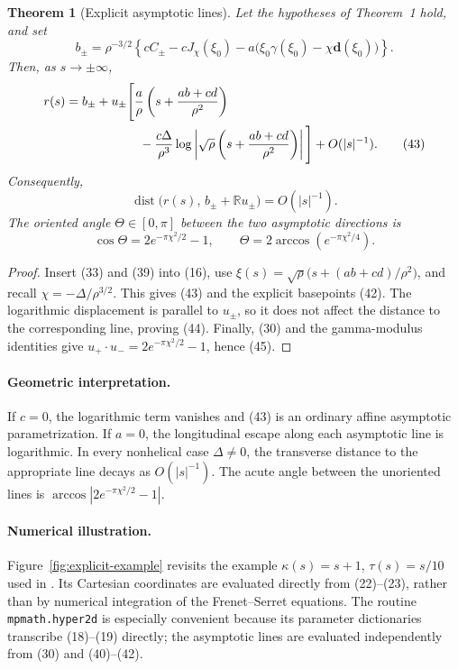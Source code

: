 \documentclass[11pt]{article}
\newtheorem{theorem}{Theorem}
\begin{document}
\begin{theorem}[Explicit asymptotic lines]
Let the hypotheses of Theorem~1 hold, and set
\begin{equation}
 b_\pm=\rho^{-3/2}\left\{
 cC_\pm-cJ_\chi(\xi_0)
 -a\bigl(\xi_0\gamma(\xi_0)-\chi\mathbf d(\xi_0)\bigr)
 \right\}. \tag{42}
\end{equation}
Then, as \(s\to\pm\infty\),
\begin{align}
 r(s)={}&b_\pm+u_\pm\Bigg[
 \frac{a}{\rho}\left(s+\frac{ab+cd}{\rho^2}\right) \notag\\
 &\hspace{16mm}-\frac{c\Delta}{\rho^3}
 \log\left|\sqrt\rho\left(s+\frac{ab+cd}{\rho^2}\right)\right|
 \Bigg]+O(|s|^{-1}). \tag{43}
\end{align}
Consequently,
\begin{equation}
 \operatorname{dist}\bigl(r(s),\,b_\pm+\mathbb R u_\pm\bigr)
 =O(|s|^{-1}). \tag{44}
\end{equation}
The oriented angle \(\Theta\in[0,\pi]\) between the two asymptotic directions is
\begin{equation}
 \cos\Theta=2e^{-\pi\chi^2/2}-1,
 \qquad
 \Theta=2\arccos\!\left(e^{-\pi\chi^2/4}\right). \tag{45}
\end{equation}
\end{theorem}

\begin{proof}
Insert (33) and (39) into (16), use
\(\xi(s)=\sqrt\rho\bigl(s+(ab+cd)/\rho^2\bigr)\), and recall
\(\chi=-\Delta/\rho^{3/2}\). This gives (43) and the explicit basepoints (42). The logarithmic displacement is parallel to \(u_\pm\), so it does not affect the distance to the corresponding line, proving (44). Finally, (30) and the gamma-modulus identities give
\(u_+\cdot u_-=2e^{-\pi\chi^2/2}-1\), hence (45).
\end{proof}

\paragraph{Geometric interpretation.}
If \(c=0\), the logarithmic term vanishes and (43) is an ordinary affine asymptotic parametrization. If \(a=0\), the longitudinal escape along each asymptotic line is logarithmic. In every nonhelical case \(\Delta\ne0\), the transverse distance to the appropriate line decays as \(O(|s|^{-1})\). The acute angle between the unoriented lines is
\(\arccos|2e^{-\pi\chi^2/2}-1|\).

\paragraph{Numerical illustration.}
Figure~\ref{fig:explicit-example} revisits the example \(\kappa(s)=s+1\), \(\tau(s)=s/10\) used in \cite[Figure~1]{LucasOrtega2026}. Its Cartesian coordinates are evaluated directly from (22)--(23), rather than by numerical integration of the Frenet--Serret equations. The routine \texttt{mpmath.hyper2d} is especially convenient because its parameter dictionaries transcribe (18)--(19) directly; the asymptotic lines are evaluated independently from (30) and (40)--(42).
\end{document}
